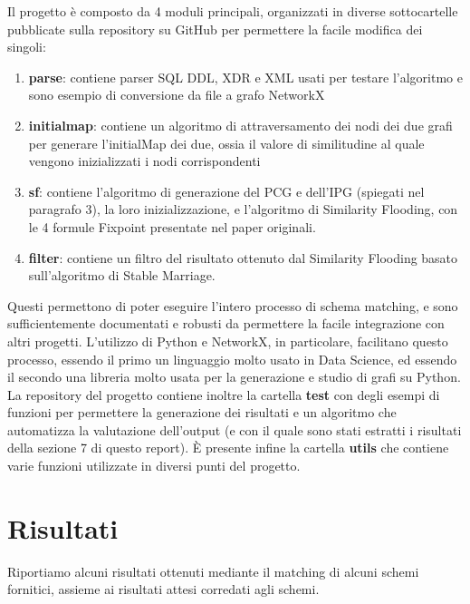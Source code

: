 \documentclass[a4paper,10pt]{article}
\begin{document}
Il progetto è composto da 4 moduli principali, organizzati in diverse sottocartelle pubblicate sulla repository su GitHub per permettere la facile modifica dei singoli:
\begin{enumerate}
	\item \textbf{parse}: contiene parser SQL DDL, XDR e XML usati per testare l'algoritmo e sono esempio di conversione da file a grafo NetworkX
	\item \textbf{initialmap}: contiene un algoritmo di attraversamento dei nodi dei due grafi per generare l'initialMap dei due, ossia il valore di similitudine al quale vengono inizializzati i nodi corrispondenti
	\item \textbf{sf}: contiene l'algoritmo di generazione del PCG e dell'IPG (spiegati nel paragrafo 3), la loro inizializzazione, e l'algoritmo di Similarity Flooding, con le 4 formule Fixpoint presentate nel paper originali. 
	\item \textbf{filter}: contiene un filtro del risultato ottenuto dal Similarity Flooding basato sull'algoritmo di Stable Marriage.
\end{enumerate}
Questi permettono di poter eseguire l'intero processo di schema matching, e sono sufficientemente documentati e robusti da permettere la facile integrazione con altri progetti. L'utilizzo di Python e NetworkX, in particolare, facilitano questo processo, essendo il primo un linguaggio molto usato in Data Science, ed essendo il secondo una libreria molto usata per la generazione e studio di grafi su Python.\\

La repository del progetto contiene inoltre la cartella \textbf{test} con degli esempi di funzioni per permettere la generazione dei risultati e un algoritmo che automatizza la valutazione dell'output (e con il quale sono stati estratti i risultati della sezione 7 di questo report). È presente infine la cartella \textbf{utils} che contiene varie funzioni utilizzate in diversi punti del progetto.


\section{Risultati}

Riportiamo alcuni risultati ottenuti mediante il matching di alcuni schemi fornitici, assieme ai risultati attesi corredati agli schemi.\\
\end{document}
